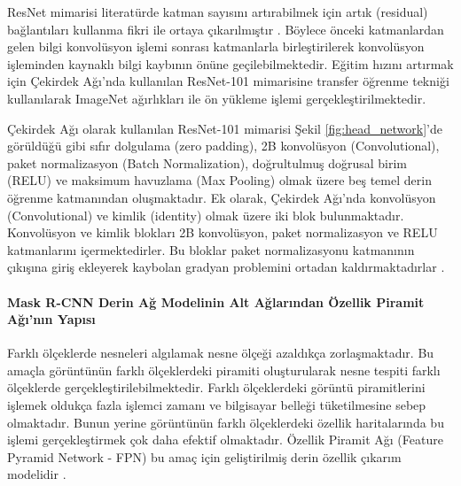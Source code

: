 ResNet mimarisi literatürde katman sayısını artırabilmek için artık (residual) bağlantıları kullanma fikri ile ortaya çıkarılmıştır \cite{he2016deep}. Böylece önceki katmanlardan gelen bilgi konvolüsyon işlemi sonrası katmanlarla birleştirilerek konvolüsyon işleminden kaynaklı bilgi kaybının önüne geçilebilmektedir. Eğitim hızını artırmak için Çekirdek Ağı'nda kullanılan ResNet-101 mimarisine transfer öğrenme tekniği kullanılarak ImageNet ağırlıkları ile ön yükleme işlemi gerçekleştirilmektedir. 

Çekirdek Ağı olarak kullanılan ResNet-101 mimarisi Şekil \ref{fig:head_network}’de görüldüğü gibi sıfır dolgulama (zero padding), 2B konvolüsyon (Convolutional), paket normalizasyon (Batch Normalization), doğrultulmuş doğrusal birim (RELU) ve maksimum havuzlama (Max Pooling) olmak üzere beş temel derin öğrenme katmanından oluşmaktadır. Ek olarak, Çekirdek Ağı'nda konvolüsyon (Convolutional) ve kimlik (identity) olmak üzere iki blok bulunmaktadır. Konvolüsyon ve kimlik blokları 2B konvolüsyon, paket normalizasyon ve RELU katmanlarını içermektedirler. Bu bloklar paket normalizasyonu katmanının çıkışına giriş ekleyerek kaybolan gradyan problemini ortadan kaldırmaktadırlar \cite{he2016deep}.

\paragraph{Mask R-CNN Derin Ağ Modelinin Alt Ağlarından Özellik Piramit Ağı'nın Yapısı}

Farklı ölçeklerde nesneleri algılamak nesne ölçeği azaldıkça zorlaşmaktadır. Bu amaçla görüntünün farklı ölçeklerdeki piramiti oluşturularak nesne tespiti farklı ölçeklerde gerçekleştirilebilmektedir. Farklı ölçeklerdeki görüntü piramitlerini işlemek oldukça fazla işlemci zamanı ve bilgisayar belleği tüketilmesine sebep olmaktadır. Bunun yerine görüntünün farklı ölçeklerdeki özellik haritalarında bu işlemi gerçekleştirmek çok daha efektif olmaktadır. Özellik Piramit Ağı (Feature Pyramid Network - FPN) bu amaç için geliştirilmiş derin özellik çıkarım modelidir \cite{lin2017feature}.  

